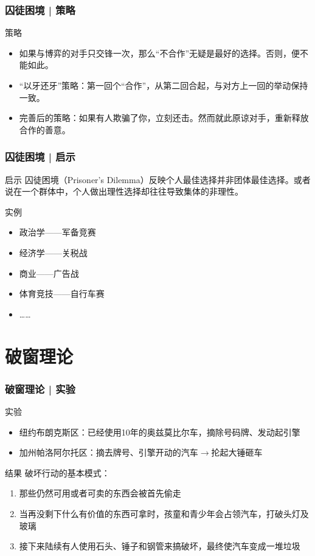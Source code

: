 \begin{frame}
  \frametitle{囚徒困境 | 策略}
  \begin{block}{策略}
    \begin{itemize}
      \item 如果与博弈的对手只交锋一次，那么“不合作”无疑是最好的选择。否则，便不能如此。
      \item “以牙还牙”策略：第一回个“合作”，从第二回合起，与对方上一回的举动保持一致。
      \item 完善后的策略：如果有人欺骗了你，立刻还击。然而就此原谅对手，重新释放合作的善意。
    \end{itemize}
  \end{block}
\end{frame}

\begin{frame}
  \frametitle{囚徒困境 | 启示}
  \begin{block}{启示}
    囚徒困境（Prisoner's Dilemma）反映个人最佳选择并非团体最佳选择。或者说在一个群体中，个人做出理性选择却往往导致集体的非理性。
  \end{block}
  \pause
  \begin{block}{实例}
    \begin{itemize}
      \item 政治学——军备竞赛
      \item 经济学——关税战
      \item 商业——广告战
      \item 体育竞技——自行车赛
      \item ……
    \end{itemize}
  \end{block}
\end{frame}

\section{破窗理论}
\begin{frame}
  \frametitle{破窗理论 | 实验}
  \begin{block}{实验}
    \begin{itemize}
      \item 纽约布朗克斯区：已经使用10年的奥兹莫比尔车，摘除号码牌、发动起引擎
      \item 加州帕洛阿尔托区：摘去牌号、引擎开动的汽车$\longrightarrow$抡起大锤砸车
    \end{itemize}
  \end{block}
  \pause
  \begin{block}{结果}
    破坏行动的基本模式：
    \begin{enumerate}
      \item 那些仍然可用或者可卖的东西会被首先偷走
      \item 当再没剩下什么有价值的东西可拿时，孩童和青少年会占领汽车，打破头灯及玻璃
      \item 接下来陆续有人使用石头、锤子和钢管来搞破坏，最终使汽车变成一堆垃圾
    \end{enumerate}
  \end{block}
\end{frame}

